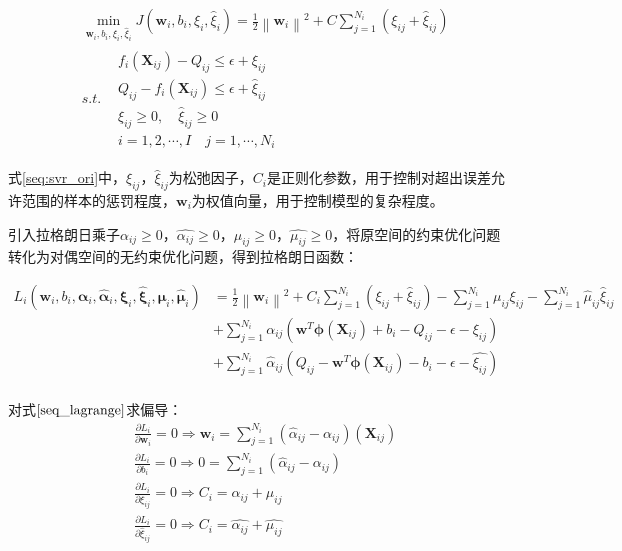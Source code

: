 \begin{equation}\label{seq:svr_ori}
\begin{split}
& \min_{\bm{w}_{i}, b_{i},\xi_{i}, \hat{\xi}_{i}}  J(\bm{w}_{i},b_{i},\xi_{i},\hat{\xi}_{i}) = \frac{1}{2} \left \| \bm{w}_{i} \right \|^{2} + C \sum_{j=1}^{N_{i}}(\xi_{ij}+\hat{\xi}_{ij})\\ 
& s.t. \begin{matrix}
& f_{i}(\bm{X}_{ij}) - Q_{ij} \leqslant \epsilon + \xi_{ij}\\
&Q_{ij} - f_{i}(\bm{X}_{ij})  \leqslant \epsilon + \hat{\xi}_{ij} \\
&\xi_{ij} \geqslant 0, \quad \hat{\xi}_{ij} \geqslant 0\\
& i=1,2,\cdots,I \quad j=1,\cdots,N_{i}
\end{matrix}
\end{split}
\end{equation}

式\eqref{seq:svr_ori}中，$\xi_{ij}$，$\hat{\xi}_{ij}$为松弛因子，$C_{i}$是正则化参数，用于控制对超出误差允许范围的样本的惩罚程度，$\bm{w}_{i}$为权值向量，用于控制模型的复杂程度。

引入拉格朗日乘子$\alpha_{ij} \geqslant 0$，$\hat{\alpha_{ij}} \geqslant 0$，$\mu_{ij} \geqslant 0$，$\hat{\mu_{ij}} \geqslant 0$，将原空间的约束优化问题转化为对偶空间的无约束优化问题，得到拉格朗日函数：

\begin{equation}\label{seq_lagrange}
\begin{aligned}
L_{i}(\bm{w}_{i}, b_{i}, \bm{\alpha}_{i}, \bm{\hat{\alpha}}_{i}, \bm{\xi}_{i}, \bm{\hat{\xi}}_{i},
\bm{\mu}_{i},\bm{\hat{\mu}}_{i})&=\frac{1}{2} \left \| \bm{{w}}_{i} \right \|^{2} + C_{i} \sum_{j=1}^{N_{i}}(\xi_{ij} + \hat{\xi}_{ij}) - \sum_{j=1}^{N_{i}}\mu_{ij}\xi_{ij} - \sum_{j=1}^{N_{i}}\hat{\mu}_{ij}\hat{\xi}_{ij} \\ 
&+ \sum_{j=1}^{N_{i}} \alpha_{ij}(\bm{w}^{T} \bm{\phi}(\bm{X}_{ij}) + b_{i} - Q_{ij} - \epsilon - \xi_{ij}) \\
&+ \sum_{j=1}^{N_{i}} \hat{\alpha}_{ij}(Q_{ij} - \bm{w}^{T} \bm{\phi}(\bm{X}_{ij}) - b_{i} - \epsilon - \hat{\xi_{ij}})\\
\end{aligned}
\end{equation}

对式$\eqref{seq_lagrange}$求偏导：
\begin{equation}\label{seq_lag_deri}
\begin{split}
&\frac{\partial{L_{i}}}{\partial{\bm{w}_{i}}}=0 \Rightarrow \bm{w}_{i} = \sum_{j=1}^{N_{i}}(\hat{\alpha}_{ij}-\alpha_{ij})(\bm{X}_{ij})
\\ 
&\frac{\partial{L_{i}}}{\partial{b_{i}}}=0 \Rightarrow 0 = \sum_{j=1}^{N_{i}}(\hat{\alpha}_{ij}-\alpha_{ij})
\\ 
&\frac{\partial{L_{i}}}{\partial{\xi_{ij}}}=0 \Rightarrow  C_{i} = \alpha_{ij} + \mu_{ij}
\\ 
&\frac{\partial{L_{i}}}{\partial{\hat{\xi}_{ij}}}=0 \Rightarrow  C_{i} = \hat{\alpha_{ij}} + \hat{\mu_{ij}}
\\
\end{split}
\end{equation}


